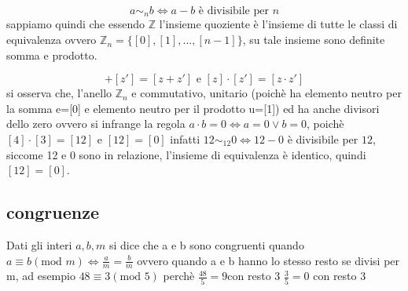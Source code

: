 \documentclass{article}
\begin{document}
        \begin{equation}
            a \sim_n b \Leftrightarrow a-b \text{ è divisibile per } n
        \end{equation}
%
        sappiamo quindi che essendo $\mathbb{Z}$ l'insieme quoziente è l'insieme di tutte le classi di equivalenza ovvero $\mathbb{Z}_n=\{[0],[1],...,[n-1]\}$, su tale insieme sono definite somma e prodotto.

        \begin{equation}
            [z]+[z']=[z+z'] \text{ e } [z]\cdot[z']=[z\cdot z'] 
        \end{equation}
        si osserva che, l'anello $\mathbb{Z}_n$ e commutativo, unitario (poichè ha elemento neutro per la somma e=[0] e elemento neutro per il prodotto u=[1]) ed ha anche divisori dello zero ovvero si infrange la regola $a\cdot b =0 \Leftrightarrow a=0\lor b=0$, poichè $[4]\cdot[3]=[12]$ e $[12]=[0]$ infatti $12\sim_{12} 0 \Leftrightarrow 12-0$ è divisibile per $12$, siccome 12 e 0 sono in relazione, l'insieme di equivalenza è identico, quindi $[12]=[0]$.
    
    \subsection{congruenze}
        Dati gli interi $a,b,m$ si dice che a e b sono congruenti quando $a\equiv b (\text{mod } m) \Leftrightarrow \frac{a}{m}=\frac{b}{m}$ ovvero quando a e b hanno lo stesso resto se divisi per m, ad esempio $48\equiv 3 (\text{mod }5)$ perchè $\frac{48}{5}=9$con resto 3 $\frac{3}{5}=0$ con resto 3
\end{document}
